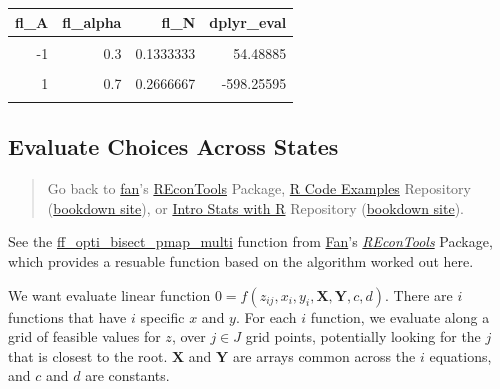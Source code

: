 \documentclass[
]{book}
\begin{document}
\begin{table}[!h]
\centering
\begin{tabular}{r|r|r|r}
\hline
fl\_A & fl\_alpha & fl\_N & dplyr\_eval\\
\hline
\cellcolor{gray!6}{-2} & \cellcolor{gray!6}{0.1} & \cellcolor{gray!6}{0.0666667} & \cellcolor{gray!6}{81.86645}\\
\hline
-1 & 0.3 & 0.1333333 & 54.48885\\
\hline
\cellcolor{gray!6}{0} & \cellcolor{gray!6}{0.5} & \cellcolor{gray!6}{0.2000000} & \cellcolor{gray!6}{-65.56190}\\
\hline
1 & 0.7 & 0.2666667 & -598.25595\\
\hline
\cellcolor{gray!6}{2} & \cellcolor{gray!6}{0.9} & \cellcolor{gray!6}{0.3333333} & \cellcolor{gray!6}{-3154.07226}\\
\hline
\end{tabular}
\end{table}

\hypertarget{evaluate-choices-across-states}{%
\subsection{Evaluate Choices Across States}\label{evaluate-choices-across-states}}

\begin{quote}
Go back to \href{http://fanwangecon.github.io/}{fan}'s \href{https://fanwangecon.github.io/REconTools/}{REconTools} Package, \href{https://fanwangecon.github.io/R4Econ/}{R Code Examples} Repository (\href{https://fanwangecon.github.io/R4Econ/bookdown}{bookdown site}), or \href{https://fanwangecon.github.io/Stat4Econ/}{Intro Stats with R} Repository (\href{https://fanwangecon.github.io/Stat4Econ/bookdown}{bookdown site}).
\end{quote}

See the \href{https://fanwangecon.github.io/REconTools/reference/ff_opti_bisect_pmap_multi.html}{ff\_opti\_bisect\_pmap\_multi} function from \href{https://fanwangecon.github.io/}{Fan}'s \emph{\href{https://fanwangecon.github.io/REconTools/}{REconTools}} Package, which provides a resuable function based on the algorithm worked out here.

We want evaluate linear function \(0=f(z_{ij}, x_i, y_i, \textbf{X}, \textbf{Y}, c, d)\). There are \(i\) functions that have \(i\) specific \(x\) and \(y\). For each \(i\) function, we evaluate along a grid of feasible values for \(z\), over \(j\in J\) grid points, potentially looking for the \(j\) that is closest to the root. \(\textbf{X}\) and \(\textbf{Y}\) are arrays common across the \(i\) equations, and \(c\) and \(d\) are constants.
\end{document}
